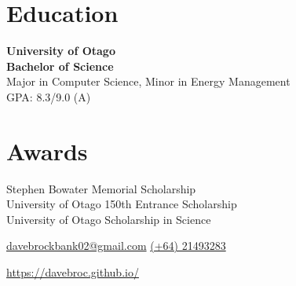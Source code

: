 \documentclass[withoutsidebar]{simplehipstercv}
\newlength{\rightcolwidth}
\begin{document}
    \bigskip
    
    \begin{minipage}[t]{0.7\textwidth}
    
    \section*{Education}
    
    \textbf{University of Otago}\\
    \textbf{Bachelor of Science}\\
    Major in Computer Science, Minor in Energy Management\\
    GPA: 8.3/9.0 (A)\\
    
    \end{minipage}
      
    \bigskip
    
    \begin{minipage}[t]{0.7\textwidth}
    \section*{Awards}
    Stephen Bowater Memorial Scholarship\\
    University of Otago 150th Entrance Scholarship\\
    University of Otago Scholarship in Science
    \bigskip
    
  
    
    \end{minipage}\hfill
    \bigskip
    \bigskip
    \bigskip
    \bigskip
    \bigskip
    \bigskip
    \bigskip
    \bigskip
    \bigskip
    \bigskip
    \bigskip
    \bigskip
    \bigskip
    \bigskip
    \bigskip
\setlength{\parindent}{0pt}
\begin{minipage}[t]{\rightcolwidth}

\fontfamily{\sfdefault}\selectfont \color{black!70}
{\begin{center}\small 
    \href{mailto:davebrockbank02@gmail.com}{ davebrockbank02@gmail.com}  
    \href{tel:021493283}{ (+64) 21493283}  
 \end{center}
\begin{center}
    \href{https://davebroc.github.io/}{ https://davebroc.github.io/}
\end{center}
}
\end{minipage}



    
    
    
\end{document}
